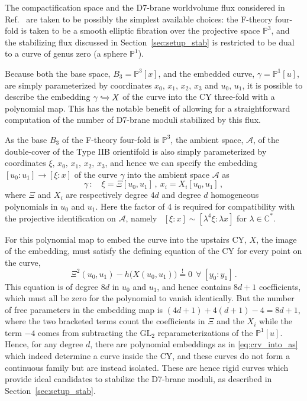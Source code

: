 \documentclass[a4paper,12pt]{article}
\numberwithin{equation}{section}
\newcommand{\mc}{\mathcal}
\newcommand{\mbb}{\mathbb}
\newcommand{\be}{\begin{equation}}
\newcommand{\ee}{\end{equation}}
\newcommand{\fthb}{B_3}				%
\newcommand{\cyu}{X}					%
\newcommand{\as}{\mc{A}}				%
\newcommand{\crv}{\gamma}			%
\begin{document}
The compactification space and the  D7-brane worldvolume flux considered in Ref.~\cite{Collinucci:2008pf} are taken to be possibly the simplest available choices: the F-theory four-fold is taken to be a smooth elliptic fibration over the projective space $\mbb{P}^3$, and the stabilizing flux discussed in Section~\ref{sec:setup_stab} is restricted to be dual to a curve of genus zero (a sphere $\mbb{P}^1$).

\bigskip

Because both the base space, $\fthb = \mbb{P}^3[x]$, and the embedded curve, $\crv = \mbb{P}^1[u]$, are simply parameterized by coordinates $x_0,\,x_1,\,x_2,\,x_3$ and $u_0,\,u_1$, it is possible to describe the embedding $\crv \xhookrightarrow{} \cyu$ of the curve into the CY three-fold with a polynomial map. This has the notable benefit of allowing for a straightforward computation of the number of D7-brane moduli stabilized by this flux.

As the base $\fthb$ of the F-theory four-fold is $\mbb{P}^3$, the ambient space, $\as$, of the double-cover of the Type IIB orientifold is also simply parameterized by coordinates $\xi,\,x_0,\,x_1,\,x_2,\,x_3$, and hence we can specify the embedding $[u_0 : u_1] \to [\xi : x]$ of the curve $\crv$ into the ambient space $\as$ as
\be
\crv \, : \quad \xi = \Xi[u_0,u_1] \,, ~ x_i = X_i[u_0,u_1] \,,
\label{eq:crv_into_as}
\ee
where $\Xi$ and $X_i$ are respectively degree $4d$ and degree $d$ homogeneous polynomials in $u_0$ and $u_1$. Here the factor of 4 is required for compatibility with the projective identification on $\as$, namely \ $[\xi:x] \sim [\lambda^4 \xi: \lambda x]$ for $\lambda \in \mbb{C}^*$.

For this polynomial map to embed the curve into the upstairs CY, $\cyu$, the image of the embedding, must satisfy the defining equation of the CY for every point on the curve,
\be
\Xi^2(u_0,u_1) - h\big(X(u_0,u_1)\big)\stackrel{!}{=}0 ~~ \forall \;[y_0:y_1]\,.
\ee
This equation is of degree $8d$ in $u_0$ and $u_1$, and hence contains $8d+1$ coefficients, which must all be zero for the polynomial to vanish identically. But the number of free parameters in the embedding map is $(4d+1)+4(d+1) - 4 = 8d+1$, where the two bracketed terms count the coefficients in $\Xi$ and the $X_i$ while the term $-4$ comes from subtracting the $\mathrm{GL}_2$ reparameterizations of the $\mbb{P}^1[u]$. Hence, for any degree $d$, there are polynomial embeddings as in \eqref{eq:crv_into_as} which indeed determine a curve inside the CY, and these curves do not form a continuous family but are instead isolated. These are hence rigid curves which provide ideal candidates to stabilize the D7-brane moduli, as described in Section~\ref{sec:setup_stab}.
\end{document}
